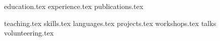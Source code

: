 \documentclass[letterpaper,11pt]{article}
\begin{document}


{education.tex}
{experience.tex}
{publications.tex}


{teaching.tex}
\sidebyside
{{skills.tex}}
{{languages.tex}}
{projects.tex}
{workshops.tex}
{talks}
{volunteering.tex}
\end{document}
